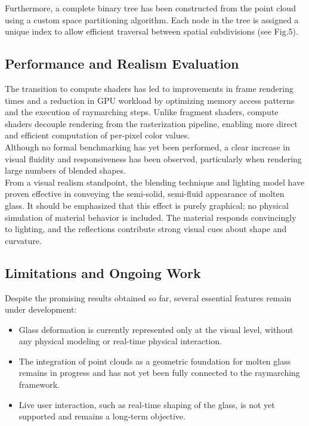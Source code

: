 \documentclass{rapportcs}
\begin{document}
        Furthermore, a complete binary tree has been constructed from the point cloud using a custom space partitioning algorithm. Each node in the tree is assigned a unique index to allow efficient traversal between spatial subdivisions (see Fig.5).

    \newpage

    \subsection{Performance and Realism Evaluation}
    
        The transition to compute shaders has led to improvements in frame rendering times and a reduction in GPU workload by optimizing memory access patterns and the execution of raymarching steps. Unlike fragment shaders, compute shaders decouple rendering from the rasterization pipeline, enabling more direct and efficient computation of per-pixel color values.\\
        
        Although no formal benchmarking has yet been performed, a clear increase in visual fluidity and responsiveness has been observed, particularly when rendering large numbers of blended shapes.\\
        
        From a visual realism standpoint, the blending technique and lighting model have proven effective in conveying the semi-solid, semi-fluid appearance of molten glass. It should be emphasized that this effect is purely graphical; no physical simulation of material behavior is included. The material responds convincingly to lighting, and the reflections contribute strong visual cues about shape and curvature.

    \subsection{Limitations and Ongoing Work}
    
        Despite the promising results obtained so far, several essential features remain under development:
        
        \begin{itemize}
            \item Glass deformation is currently represented only at the visual level, without any physical modeling or real-time physical interaction.\\
        
            \item The integration of point clouds as a geometric foundation for molten glass remains in progress and has not yet been fully connected to the raymarching framework.\\
        
            \item Live user interaction, such as real-time shaping of the glass, is not yet supported and remains a long-term objective.\\
        \end{itemize}
        
\end{document}
